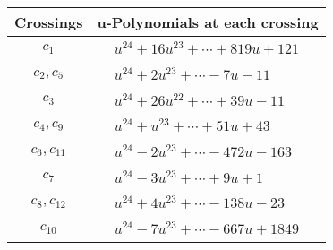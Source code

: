 \documentclass[1p]{elsarticle_modified}
\theoremstyle{definition}
\begin{document}
\begin{tabular}{m{50pt}|m{274pt}}
Crossings & \hspace{64pt}u-Polynomials at each crossing \\
\hline $$\begin{aligned}c_{1}\end{aligned}$$&$\begin{aligned}
&u^{24}+16 u^{23}+\cdots+819 u+121
\end{aligned}$\\
\hline $$\begin{aligned}c_{2},c_{5}\end{aligned}$$&$\begin{aligned}
&u^{24}+2 u^{23}+\cdots-7 u-11
\end{aligned}$\\
\hline $$\begin{aligned}c_{3}\end{aligned}$$&$\begin{aligned}
&u^{24}+26 u^{22}+\cdots+39 u-11
\end{aligned}$\\
\hline $$\begin{aligned}c_{4},c_{9}\end{aligned}$$&$\begin{aligned}
&u^{24}+u^{23}+\cdots+51 u+43
\end{aligned}$\\
\hline $$\begin{aligned}c_{6},c_{11}\end{aligned}$$&$\begin{aligned}
&u^{24}-2 u^{23}+\cdots-472 u-163
\end{aligned}$\\
\hline $$\begin{aligned}c_{7}\end{aligned}$$&$\begin{aligned}
&u^{24}-3 u^{23}+\cdots+9 u+1
\end{aligned}$\\
\hline $$\begin{aligned}c_{8},c_{12}\end{aligned}$$&$\begin{aligned}
&u^{24}+4 u^{23}+\cdots-138 u-23
\end{aligned}$\\
\hline $$\begin{aligned}c_{10}\end{aligned}$$&$\begin{aligned}
&u^{24}-7 u^{23}+\cdots-667 u+1849
\end{aligned}$\\
\hline
\end{tabular}\\~\\
\end{document}
